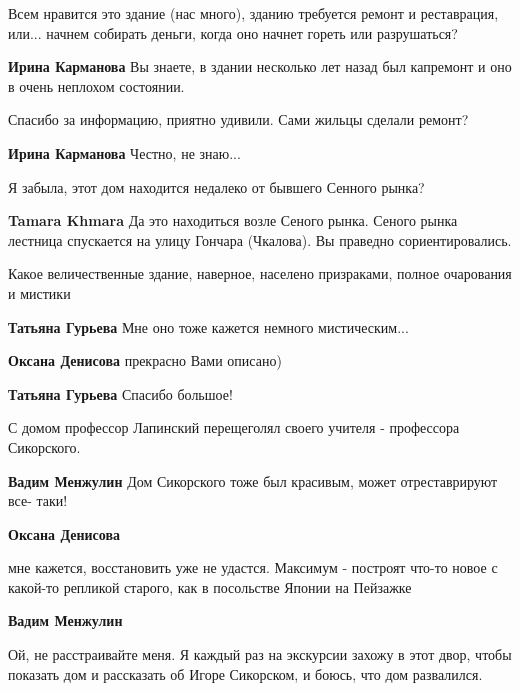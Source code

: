 \begin{itemize}

Всем нравится это здание (нас много), зданию требуется ремонт и реставрация,
или... начнем собирать деньги, когда оно начнет гореть или разрушаться?

\begin{itemize} %
\textbf{Ирина Карманова} Вы знаете, в здании несколько лет назад был капремонт и оно в очень неплохом состоянии.

Спасибо за информацию, приятно удивили. Сами жильцы сделали ремонт?

\textbf{Ирина Карманова} Честно, не знаю...
\end{itemize} %

Я забыла, этот дом находится недалеко от бывшего Сенного рынка?

\textbf{Tamara Khmara} Да это находиться возле Сеного рынка. Сеного рынка лестница спускается на улицу Гончара (Чкалова). Вы праведно сориентировались.

Какое величественные здание, наверное, населено призраками, полное очарования и мистики

\begin{itemize} %
\textbf{Татьяна Гурьева} Мне оно тоже кажется немного мистическим...

\textbf{Оксана Денисова} прекрасно Вами описано)

\textbf{Татьяна Гурьева} Спасибо большое!
\end{itemize} %

С домом профессор Лапинский перещеголял своего учителя - профессора Сикорского.

\begin{itemize} %
\textbf{Вадим Менжулин} Дом Сикорского тоже был красивым, может отреставрируют все- таки!

\textbf{Оксана Денисова} 

мне кажется, восстановить уже не удастся. Максимум - построят что-то новое с
какой-то репликой старого, как в посольстве Японии на Пейзажке

\textbf{Вадим Менжулин} 

Ой, не расстраивайте меня. Я каждый раз на экскурсии захожу в этот двор, чтобы
показать дом и рассказать об Игоре Сикорском, и боюсь, что дом развалился.



\end{itemize}
\end{itemize}
